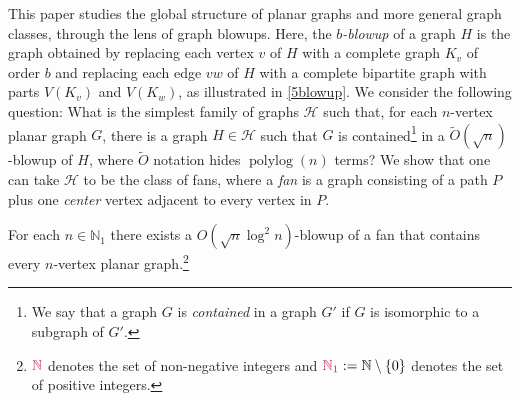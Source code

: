 \documentclass{patmorin}
\makeatletter
\newcommand{\defin}[1]{\emph{\textcolor{brightmaroon}{#1}}}
\def\mathcolor#1#{\@mathcolor{#1}}
\def\@mathcolor#1#2#3{%
  \protect\leavevmode
  \begingroup
    \color#1{#2}#3%
  \endgroup
}
\newcommand{\mathdefin}[1]{\mathcolor{brightmaroon}{#1}}
\DeclareMathOperator{\polylog}{polylog}
\newcommand{\NN}{\mathbb{N}}
\makeatother
\begin{document}
%


This paper studies the global structure of planar graphs and more general graph classes, through the lens of graph blowups. Here, the \defin{$b$-blowup} of a graph $H$ is the graph obtained by replacing each vertex $v$ of $H$ with a complete graph $K_v$ of order $b$ and replacing each edge $vw$ of $H$ with a complete bipartite graph with parts $V(K_v)$ and $V(K_w)$, as illustrated in \cref{5blowup}. We consider the following question: What is the simplest family of graphs $\mathcal{H}$ such that, for each $n$-vertex planar graph $G$, there is a graph $H\in\mathcal{H}$ such that $G$ is contained\footnote{We say that a graph $G$ is \defin{contained} in a graph $G'$ if $G$ is isomorphic to a subgraph of $G'$.} in a $\tilde{O}(\sqrt{n})$-blowup of $H$, where $\tilde{O}$ notation hides $\polylog(n)$ terms? We show that one can  take $\mathcal{H}$ to be the class of fans, where a \defin{fan} is a graph consisting of a path $P$ plus one \defin{center} vertex adjacent to every vertex in $P$.

\begin{thm}\label{main_thm_planar}
    For each $n\in\NN_1$ there exists a $O(\sqrt{n}\log^2n)$-blowup of a fan that contains every $n$-vertex planar graph.\footnote{$\mathdefin{\N}$ denotes the set of non-negative integers and $\mathdefin{\N_1}:=\N\setminus\{0\}$ denotes the set of positive integers.}
\end{thm}
\end{document}
